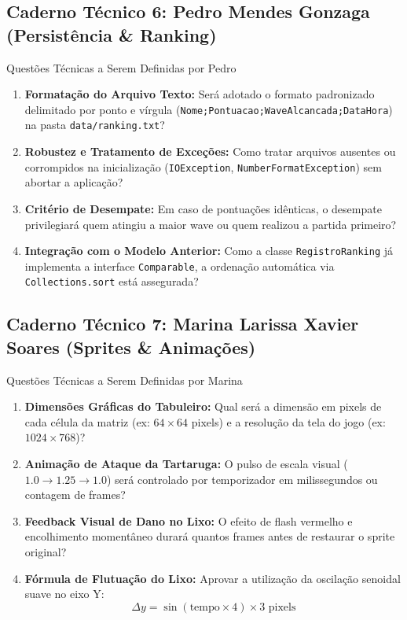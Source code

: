 \documentclass[11pt,a4paper]{article}
\begin{document}
\subsection{Caderno Técnico 6: Pedro Mendes Gonzaga (Persistência \& Ranking)}

\begin{perguntaBox}{Questões Técnicas a Serem Definidas por Pedro}
\begin{enumerate}
  \item \textbf{Formatação do Arquivo Texto:} Será adotado o formato padronizado delimitado por ponto e vírgula (\texttt{Nome;Pontuacao;WaveAlcancada;DataHora}) na pasta \texttt{data/ranking.txt}?
  \item \textbf{Robustez e Tratamento de Exceções:} Como tratar arquivos ausentes ou corrompidos na inicialização (\texttt{IOException}, \texttt{NumberFormatException}) sem abortar a aplicação?
  \item \textbf{Critério de Desempate:} Em caso de pontuações idênticas, o desempate privilegiará quem atingiu a maior wave ou quem realizou a partida primeiro?
  \item \textbf{Integração com o Modelo Anterior:} Como a classe \texttt{RegistroRanking} já implementa a interface \texttt{Comparable}, a ordenação automática via \texttt{Collections.sort} está assegurada?
\end{enumerate}
\end{perguntaBox}

\subsection{Caderno Técnico 7: Marina Larissa Xavier Soares (Sprites \& Animações)}

\begin{perguntaBox}{Questões Técnicas a Serem Definidas por Marina}
\begin{enumerate}
  \item \textbf{Dimensões Gráficas do Tabuleiro:} Qual será a dimensão em pixels de cada célula da matriz (ex: $64 \times 64$ pixels) e a resolução da tela do jogo (ex: $1024 \times 768$)?
  \item \textbf{Animação de Ataque da Tartaruga:} O pulso de escala visual ($1.0 \rightarrow 1.25 \rightarrow 1.0$) será controlado por temporizador em milissegundos ou contagem de frames?
  \item \textbf{Feedback Visual de Dano no Lixo:} O efeito de flash vermelho e encolhimento momentâneo durará quantos frames antes de restaurar o sprite original?
  \item \textbf{Fórmula de Flutuação do Lixo:} Aprovar a utilização da oscilação senoidal suave no eixo Y:
  $$\Delta y = \sin(\text{tempo} \times 4) \times 3 \text{ pixels}$$
\end{enumerate}
\end{perguntaBox}
\end{document}
